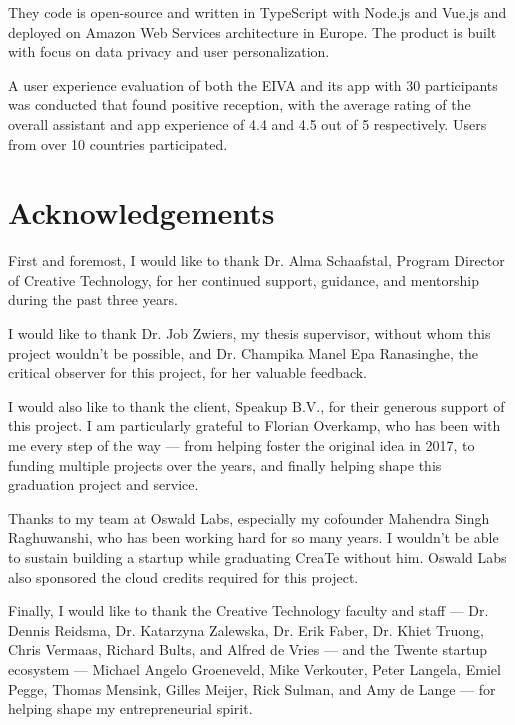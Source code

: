 \documentclass{article}
\begin{document}
They code is open-source and written in TypeScript with Node.js and Vue.js and deployed on Amazon Web Services architecture in Europe. The product is built with focus on data privacy and user personalization.

A user experience evaluation of both the EIVA and its app with 30 participants was conducted that found positive reception, with the average rating of the overall assistant and app experience	 of 4.4 and 4.5 out of 5 respectively. Users from over 10 countries participated.

\newpage

\section*{Acknowledgements}

First and foremost, I would like to thank Dr. Alma Schaafstal, Program Director of Creative Technology, for her continued support, guidance, and mentorship during the past three years.

I would like to thank Dr. Job Zwiers, my thesis supervisor, without whom this project wouldn't be possible, and Dr. Champika Manel Epa Ranasinghe, the critical observer for this project, for her valuable feedback.

I would also like to thank the client, Speakup B.V., for their generous support of this project. I am particularly grateful to Florian Overkamp, who has been with me every step of the way --- from helping foster the original idea in 2017, to funding multiple projects over the years, and finally helping shape this graduation project and service.

Thanks to my team at Oswald Labs, especially my cofounder Mahendra Singh Raghuwanshi, who has been working hard for so many years. I wouldn't be able to sustain building a startup while graduating CreaTe without him. Oswald Labs also sponsored the cloud credits required for this project.

Finally, I would like to thank the Creative Technology faculty and staff --- Dr. Dennis Reidsma, Dr. Katarzyna Zalewska, Dr. Erik Faber, Dr. Khiet Truong, Chris Vermaas, Richard Bults, and Alfred de Vries --- and the Twente startup ecosystem --- Michael Angelo Groeneveld, Mike Verkouter, Peter Langela, Emiel Pegge, Thomas Mensink, Gilles Meijer, Rick Sulman, and Amy de Lange --- for helping shape my entrepreneurial spirit.

\newpage

\tableofcontents
\end{document}
